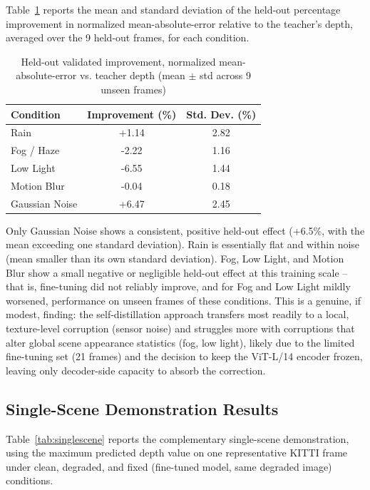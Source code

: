 \documentclass[conference]{IEEEtran}
\begin{document}
Table~\ref{tab:heldout} reports the mean and standard deviation of the held-out percentage improvement in normalized mean-absolute-error relative to the teacher's depth, averaged over the 9 held-out frames, for each condition.

\begin{table}[!t]
\caption{Held-out validated improvement, normalized mean-absolute-error vs. teacher depth (mean $\pm$ std across 9 unseen frames)}
\label{tab:heldout}
\centering
\begin{tabular}{lcc}
\toprule
\textbf{Condition} & \textbf{Improvement (\%)} & \textbf{Std. Dev. (\%)} \\
\midrule
Rain            & +1.14 & 2.82 \\
Fog / Haze      & -2.22 & 1.16 \\
Low Light       & -6.55 & 1.44 \\
Motion Blur     & -0.04 & 0.18 \\
Gaussian Noise  & +6.47 & 2.45 \\
\bottomrule
\end{tabular}
\end{table}

Only Gaussian Noise shows a consistent, positive held-out effect (+6.5\%, with the mean exceeding one standard deviation). Rain is essentially flat and within noise (mean smaller than its own standard deviation). Fog, Low Light, and Motion Blur show a small negative or negligible held-out effect at this training scale -- that is, fine-tuning did not reliably improve, and for Fog and Low Light mildly worsened, performance on unseen frames of these conditions. This is a genuine, if modest, finding: the self-distillation approach transfers most readily to a local, texture-level corruption (sensor noise) and struggles more with corruptions that alter global scene appearance statistics (fog, low light), likely due to the limited fine-tuning set (21 frames) and the decision to keep the ViT-L/14 encoder frozen, leaving only decoder-side capacity to absorb the correction.

\subsection{Single-Scene Demonstration Results}

Table~\ref{tab:singlescene} reports the complementary single-scene demonstration, using the maximum predicted depth value on one representative KITTI frame under clean, degraded, and fixed (fine-tuned model, same degraded image) conditions.
\end{document}
